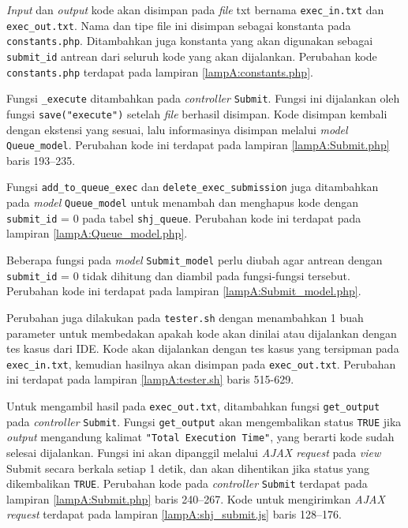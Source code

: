 \textit{Input} dan \textit{output} kode akan disimpan pada \textit{file} txt bernama \verb|exec_in.txt| dan \verb|exec_out.txt|. Nama dan tipe file ini disimpan sebagai konstanta pada \verb|constants.php|. Ditambahkan juga konstanta yang akan digunakan sebagai \verb|submit_id| antrean dari seluruh kode yang akan dijalankan. Perubahan kode \verb|constants.php| terdapat pada lampiran \ref{lampA:constants.php}.

Fungsi \verb|_execute| ditambahkan pada \textit{controller} \verb|Submit|. Fungsi ini dijalankan oleh fungsi \verb|save("execute")| setelah \textit{file} berhasil disimpan. Kode disimpan kembali dengan ekstensi yang sesuai, lalu informasinya disimpan melalui \textit{model} \verb|Queue_model|. Perubahan kode ini terdapat pada lampiran \ref{lampA:Submit.php} baris 193--235.

Fungsi \verb|add_to_queue_exec| dan \verb|delete_exec_submission| juga ditambahkan pada \textit{model} \linebreak \verb|Queue_model| untuk menambah dan menghapus kode dengan \verb|submit_id| = 0 pada tabel \verb|shj_queue|. Perubahan kode ini terdapat pada lampiran \ref{lampA:Queue_model.php}.

Beberapa fungsi pada \textit{model} \verb|Submit_model| perlu diubah agar antrean dengan \verb|submit_id| = 0 tidak dihitung dan diambil pada fungsi-fungsi tersebut. Perubahan kode ini terdapat pada lampiran \ref{lampA:Submit_model.php}.

Perubahan juga dilakukan pada \verb|tester.sh| dengan menambahkan 1 buah parameter untuk membedakan apakah kode akan dinilai atau dijalankan dengan tes kasus dari IDE. Kode akan dijalankan dengan tes kasus yang tersipman pada \verb|exec_in.txt|, kemudian hasilnya akan disimpan pada \verb|exec_out.txt|. Perubahan ini terdapat pada lampiran \ref{lampA:tester.sh} baris 515-629. 

Untuk mengambil hasil pada \verb|exec_out.txt|, ditambahkan fungsi \verb|get_output| pada  \textit{controller} \verb|Submit|. Fungsi \verb|get_output| akan mengembalikan status \verb|TRUE| jika \textit{output} mengandung kalimat \verb|"Total Execution Time"|, yang berarti kode sudah selesai dijalankan.  Fungsi ini akan dipanggil melalui \textit{AJAX request} pada \textit{view} Submit secara berkala setiap 1 detik, dan akan dihentikan jika status yang dikembalikan \verb|TRUE|. Perubahan kode pada \textit{controller} \verb|Submit| terdapat pada lampiran \ref{lampA:Submit.php} baris 240--267. Kode untuk mengirimkan \textit{AJAX request} terdapat pada lampiran \ref{lampA:shj_submit.js} baris 128--176.

